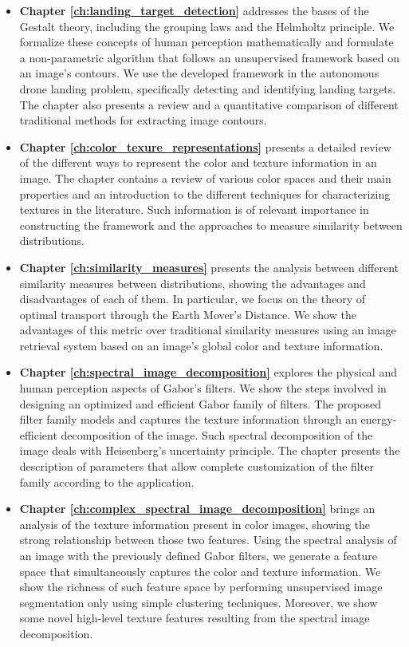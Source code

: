 \begin{itemize}
	\item \textbf{Chapter \ref{ch:landing_target_detection}} addresses the bases of the Gestalt theory, including the grouping laws and the Helmholtz principle. We formalize these concepts of human perception mathematically and formulate a non-parametric algorithm that follows an unsupervised framework based on an image's contours. We use the developed framework in the autonomous drone landing problem, specifically detecting and identifying landing targets.  The chapter also presents a review and a quantitative comparison of different traditional methods for extracting image contours.
	
	\item \textbf{Chapter \ref{ch:color_texure_representations}} presents a detailed review of the different ways to represent the color and texture information in an image. The chapter contains a review of various color spaces and their main properties and an introduction to the different techniques for characterizing textures in the literature. Such information is of relevant importance in constructing the framework and the approaches to measure similarity between distributions.
	
	\item \textbf{Chapter \ref{ch:similarity_measures}} presents the analysis between different similarity measures between distributions, showing the advantages and disadvantages of each of them. In particular, we focus on the theory of optimal transport through the Earth Mover's Distance. We show the advantages of this metric over traditional similarity measures using an image retrieval system based on an image's global color and texture information.
	
	\item \textbf{Chapter \ref{ch:spectral_image_decomposition}} explores the physical and human perception aspects of Gabor's filters. We show the steps involved in designing an optimized and efficient Gabor family of filters. The proposed filter family models and captures the texture information through an energy-efficient decomposition of the image. Such spectral decomposition of the image deals with Heisenberg's uncertainty principle. The chapter presents the description of parameters that allow complete customization of the filter family according to the application.
	
	\item \textbf{Chapter \ref{ch:complex_spectral_image_decomposition}} brings an analysis of the texture information present in color images, showing the strong relationship between those two features. Using the spectral analysis of an image with the previously defined Gabor filters, we generate a feature space that simultaneously captures the color and texture information. We show the richness of such feature space by performing unsupervised image segmentation only using simple clustering techniques. Moreover, we show some novel high-level texture features resulting from the spectral image decomposition.
	

\end{itemize}
